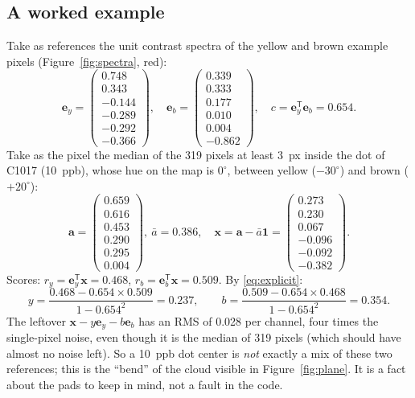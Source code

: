 \documentclass[11pt,letterpaper]{article}
\newcommand{\va}{\mathbf{a}}
\newcommand{\vx}{\mathbf{x}}
\newcommand{\vone}{\mathbf{1}}
\newcommand{\ey}{\mathbf{e}_y}
\newcommand{\eb}{\mathbf{e}_b}
\newcommand{\T}{^{\mathsf{T}}}
\begin{document}
\subsection{A worked example}
\label{sec:worked}

Take as references the unit contrast spectra of the yellow and brown example
pixels (Figure~\ref{fig:spectra}, red):
\[
\ey = \begin{pmatrix} 0.748\\ 0.343\\ -0.144\\ -0.289\\ -0.292\\ -0.366
\end{pmatrix},\quad
\eb = \begin{pmatrix} 0.339\\ 0.333\\ 0.177\\ 0.010\\ 0.004\\ -0.862
\end{pmatrix},\quad
c = \ey\T\eb = 0.654 .
\]
Take as the pixel the median of the 319 pixels at least 3~px inside the dot
of C1017 (10~ppb), whose hue on the map is $0^\circ$, between yellow
($-30^\circ$) and brown ($+20^\circ$):
\[
\va = \begin{pmatrix} 0.659\\ 0.616\\ 0.453\\ 0.290\\ 0.295\\ 0.004
\end{pmatrix},\ \bar a = 0.386,\quad
\vx = \va - \bar a\vone = \begin{pmatrix} 0.273\\ 0.230\\ 0.067\\ -0.096\\
-0.092\\ -0.382 \end{pmatrix}.
\]
Scores: $r_y = \ey\T\vx = 0.468$, $r_b = \eb\T\vx = 0.509$.  By
\eqref{eq:explicit}:
\[
y = \frac{0.468 - 0.654 \times 0.509}{1 - 0.654^2} = 0.237,\qquad
b = \frac{0.509 - 0.654 \times 0.468}{1 - 0.654^2} = 0.354 .
\]
The leftover $\vx - y\ey - b\eb$ has an RMS of 0.028 per channel, four
times the single-pixel noise, even though it is the median of 319 pixels
(which should have almost no noise left).  So a 10~ppb dot center is
\emph{not} exactly a mix of these two references; this is the ``bend'' of
the cloud visible in Figure~\ref{fig:plane}.  It is a fact about the pads to
keep in mind, not a fault in the code.
\end{document}

